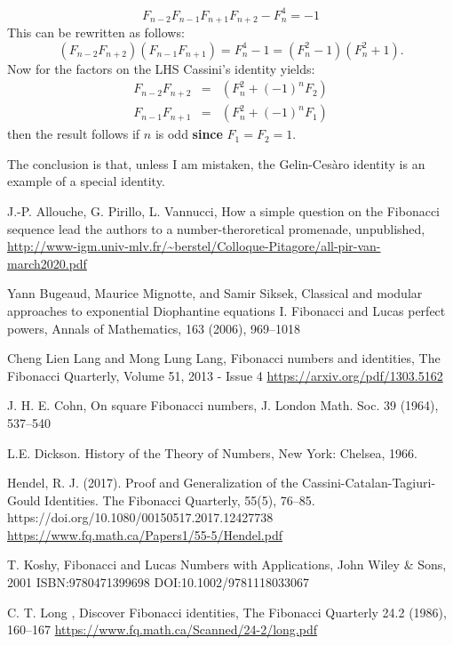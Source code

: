 \documentclass[12pt,a4paper]{amsart}
\begin{document}
\begin{equation*}
	F_{n-2}F_{n-1}F_{n+1}F_{n+2} - F_{n}^4 = -1 
\end{equation*}
This can be rewritten as follows:
$$ 	(F_{n-2}F_{n+2})(F_{n-1}F_{n+1}) = F_n^4 - 1 = (F_n^2 - 1)(F_n^2 + 1).$$
Now for the factors on the LHS Cassini's identity yields:
\begin{eqnarray*}
	F_{n-2}F_{n+2}&=& (F_n^2 +(-1)^n F_2)\\
	F_{n-1}F_{n+1}&=& (F_n^2 +(-1)^n F_1)
\end{eqnarray*}
then the result follows if $n$ is odd \textbf{since} $F_1 = F_2 = 1$.

The conclusion is that, unless I am mistaken, the Gelin-Cesàro identity is an example of a special identity.





J.-P. Allouche, G. Pirillo, L. Vannucci,
How a simple question on the Fibonacci sequence
lead the authors to a number-theroretical promenade, unpublished,
\url{http://www-igm.univ-mlv.fr/~berstel/Colloque-Pitagore/all-pir-van-march2020.pdf}

Yann Bugeaud, Maurice Mignotte, and Samir Siksek,
Classical and modular approaches
to exponential Diophantine equations
I. Fibonacci and Lucas perfect powers,
Annals of Mathematics, 163 (2006), 969–1018

Cheng Lien Lang and Mong Lung Lang,
Fibonacci numbers and identities,
The Fibonacci Quarterly,
Volume 51, 2013 - Issue 4
\url{https://arxiv.org/pdf/1303.5162}

J. H. E. Cohn, On square Fibonacci numbers, J. London Math. Soc. 39 (1964), 537–540


L.E. Dickson. History of the Theory of Numbers,
New York: Chelsea, 1966. 


Hendel, R. J. (2017). Proof and Generalization of the Cassini-Catalan-Tagiuri-Gould Identities. The Fibonacci Quarterly, 55(5), 76–85. https://doi.org/10.1080/00150517.2017.12427738
\url{https://www.fq.math.ca/Papers1/55-5/Hendel.pdf}

 T. Koshy, Fibonacci and Lucas Numbers with Applications,
John Wiley \& Sons, 2001 ISBN:9780471399698 DOI:10.1002/9781118033067

C. T. Long , Discover Fibonacci identities, The Fibonacci Quarterly 24.2 (1986), 160–167
\url{https://www.fq.math.ca/Scanned/24-2/long.pdf}
\end{document}
